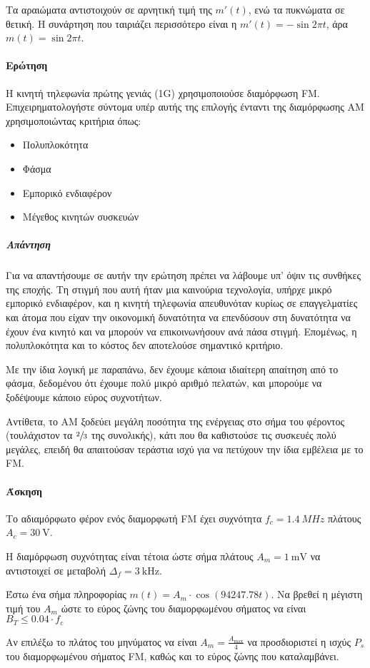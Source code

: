 \documentclass[11pt,a4paper,notitlepage,fleqn,final]{article}
\begin{document}
Τα αραιώματα αντιστοιχούν σε αρνητική τιμή της \( m'(t) \), ενώ τα πυκνώματα σε θετική. Η
συνάρτηση που ταιριάζει περισσότερο είναι η \( m'(t) = -\sin 2πt \), άρα \( m(t) = \sin 2πt \).

\paragraph{Ερώτηση}
Η κινητή τηλεφωνία πρώτης γενιάς (1G) χρησιμοποιούσε διαμόρφωση FM. Επιχειρηματολογήστε
σύντομα υπέρ αυτής της επιλογής ένταντι της διαμόρφωσης AM χρησιμοποιώντας κριτήρια όπως:
\begin{itemize}
	\item Πολυπλοκότητα
	\item Φάσμα
	\item Εμπορικό ενδιαφέρον
	\item Μέγεθος κινητών συσκευών
\end{itemize}
\subparagraph{Απάντηση}
Για να απαντήσουμε σε αυτήν την ερώτηση πρέπει να λάβουμε υπ' όψιν τις συνθήκες της εποχής.
Τη στιγμή που αυτή ήταν μια καινούρια τεχνολογία, υπήρχε μικρό εμπορικό ενδιαφέρον, και
η κινητή τηλεφωνία απευθυνόταν κυρίως σε επαγγελματίες και άτομα που είχαν την οικονομική
δυνατότητα να επενδύσουν στη δυνατότητα να έχουν ένα κινητό και να μπορούν να επικοινωνήσουν
ανά πάσα στιγμή. Επομένως, η πολυπλοκότητα και το κόστος δεν αποτελούσε σημαντικό κριτήριο.

Με την ίδια λογική με παραπάνω, δεν έχουμε κάποια ιδιαίτερη απαίτηση από το φάσμα, δεδομένου
ότι έχουμε πολύ μικρό αριθμό πελατών, και μπορούμε να ξοδέψουμε κάποιο εύρος συχνοτήτων.

Αντίθετα, το AM ξοδεύει μεγάλη ποσότητα της ενέργειας στο σήμα του φέροντος
(τουλάχιστον τα \( \sfrac{2}{3} \) της συνολικής), κάτι που θα
καθιστούσε τις συσκευές πολύ μεγάλες, επειδή θα απαιτούσαν τεράστια ισχύ για να πετύχουν
την ίδια εμβέλεια με το FM.

\paragraph{Άσκηση}
Το αδιαμόρφωτο φέρον ενός διαμορφωτή FM έχει συχνότητα \( f_c = \SI{1.4}{MHz} \) πλάτους
\( A_c = \SI{30}{\volt} \).

Η διαμόρφωση συχνότητας είναι τέτοια ώστε σήμα πλάτους \( A_m = \SI{1}{\milli\volt} \)
να αντιστοιχεί σε μεταβολή \( Δ_f = \SI{3}{\kilo\hertz} \).

\begin{enumgreekpar}
	\item Έστω ένα σήμα πληροφορίας \( m(t) = A_m \cdot \cos(94247.78 t) \).
	Να βρεθεί η μέγιστη τιμή του \( A_m \) ώστε το εύρος ζώνης του διαμορφωμένου σήματος
	να είναι \( B_T \leq 0.04\cdot f_c \)
	\item Αν επιλέξω το πλάτος του μηνύματος να είναι \( A_m = \frac{A_{\max}}{4} \)
	να προσδιοριστεί η ισχύς \( P_s \) του διαμορφωμένου σήματος FM, καθώς και το εύρος
	ζώνης που καταλαμβάνει.
\end{enumgreekpar}
\end{document}
